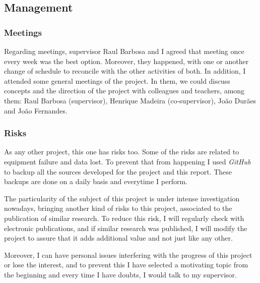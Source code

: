\subsection{Management}

\subsubsection{Meetings}

Regarding meetings, supervisor Raul Barbosa and I agreed that meeting once every week was the best option. Moreover, they happened, with one or another change of schedule to reconcile with the other activities of both. In addition, I attended some general meetings of the project. In them, we could discuss concepts and the direction of the project with colleagues and teachers, among them: Raul Barbosa (supervisor), Henrique Madeira (co-supervisor), João Durães and João Fernandes.

\subsubsection{Risks}

As any other project, this one has risks too.
Some of the risks are related to equipment failure and data lost. To prevent that from happening I used \textit{GitHub} to backup all the sources developed for the project and this report. These backups are done on a daily basis and everytime I perform.

The particularity of the subject of this project is under intense investigation nowadays, bringing another kind of risks to this project, associated to the publication of similar research. To reduce this risk, I will regularly check with electronic publications, and if similar research was published, I will modify the project to assure that it adds additional value and not just like any other.

Moreover, I can have personal issues interfering with the progress of this project or lose the interest, and to prevent this I have selected a motivating topic from the beginning and every time I have doubts, I would talk to my supervisor.

